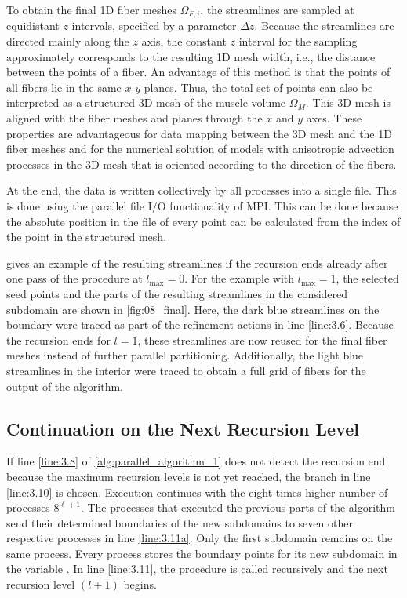 To obtain the final 1D fiber meshes $\Omega_{F,i}$, the streamlines are sampled at equidistant $z$ intervals, specified by a parameter $\Delta z$. Because the streamlines are directed mainly along the $z$ axis, the constant $z$ interval for the sampling approximately corresponds to the resulting 1D mesh width, i.e., the distance between the points of a fiber. An advantage of this method is that the points of all fibers lie in the same $x$-$y$ planes. Thus, the total set of points can also be interpreted as a structured 3D mesh of the muscle volume $\Omega_M$. This 3D mesh is aligned with the fiber meshes and planes through the $x$ and $y$ axes. These properties are advantageous for data mapping between the 3D mesh and the 1D fiber meshes and for the numerical solution of models with anisotropic advection processes in the 3D mesh that is oriented according to the direction of the fibers.

At the end, the data is written collectively by all processes into a single file. This is done using the parallel file I/O functionality of MPI. This can be done because the absolute position in the file of every point can be calculated from the index of the point in the structured mesh.

 gives an example of the resulting streamlines if the recursion ends already after one pass of the procedure at $l_\text{max}=0$. For the example with $l_\text{max}=1$, the selected seed points and the parts of the resulting streamlines in the considered subdomain are shown in \cref{fig:08_final}. Here, the dark blue streamlines on the boundary were traced as part of the refinement actions in line \ref{line:3.6}. Because the recursion ends for $l=1$, these streamlines are now reused for the final fiber meshes instead of further parallel partitioning. Additionally, the light blue streamlines in the interior were traced to obtain a full grid of fibers for the output of the algorithm.

\subsection{Continuation on the Next Recursion Level}

If line \ref{line:3.8} of \cref{alg:parallel_algorithm_1} does not detect the recursion end because the maximum recursion levels is not yet reached, the  branch in line \ref{line:3.10} is chosen.
Execution continues with the eight times higher number of processes $8^{\ell+1}$. The processes that executed the previous parts of the algorithm send their determined boundaries of the new subdomains to seven other respective processes in line \cref{line:3.11a}. 
Only the first subdomain remains on the same process. Every process stores the boundary points for its new subdomain in the variable . In line \cref{line:3.11}, the procedure is called recursively and the next recursion level $(l+1)$ begins.

